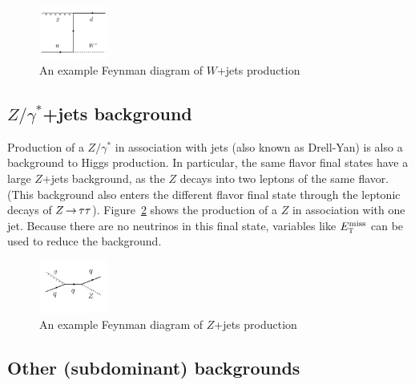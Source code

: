 \begin{figure}[h!]
  \centering
  \captionsetup{justification=centering}

  \includegraphics[width=0.2\textwidth]{figures/Feyn_W}
  \caption{An example Feynman diagram of $W$+jets production}
  \label{fig:Wdiagram}
\end{figure}

\subsection{$Z/\gamma^{*}$+jets background}

Production of a $Z/\gamma^{*}$  in association with jets (also known as Drell-Yan) is also a background to Higgs production. In particular, the same flavor final states have a large $Z$+jets background, as the $Z$ decays into two leptons of the same flavor. (This background also enters the different flavor final state through the leptonic decays of $Z\,{\rightarrow}\,\tau\tau$). Figure~\ref{fig:Zdiagram} shows the production of a $Z$ in association with one jet. Because there are no neutrinos in this final state, variables like $E_{\textrm{\footnotesize\sc t}}^{\rm miss}$ can be used to reduce the background. 

\begin{figure}[h!]
  \centering
  \captionsetup{justification=centering}

  \includegraphics[width=0.2\textwidth]{figures/Feyn_Zjets}
  \caption{An example Feynman diagram of $Z$+jets production}
  \label{fig:Zdiagram}
\end{figure}

\subsection{Other (subdominant) backgrounds}

